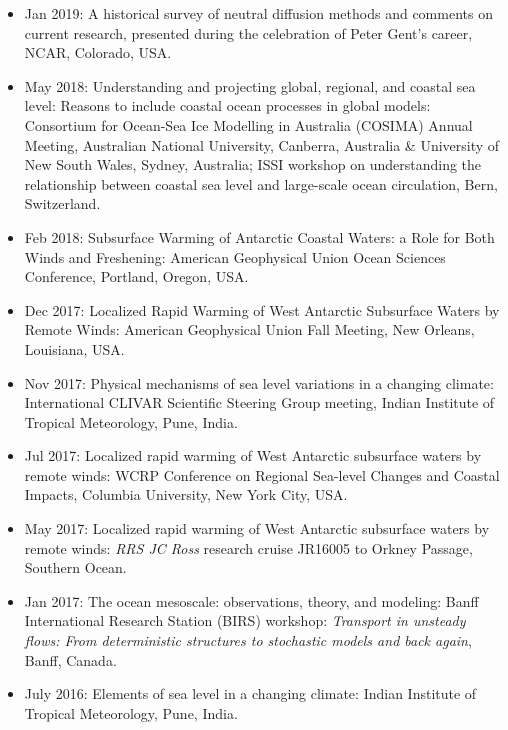 \begin{itemize}[leftmargin=*]
\item Jan 2019: {\sc A historical survey of neutral diffusion methods and comments on current research}, presented during the celebration of Peter Gent's career, NCAR, Colorado, USA.  

\item May 2018: {\sc Understanding and projecting global, regional, and coastal sea level: Reasons to include coastal ocean processes in global models}: Consortium for Ocean-Sea Ice Modelling in Australia (COSIMA) Annual Meeting, Australian National University, Canberra, Australia \& University of New South Wales, Sydney, Australia; ISSI workshop on understanding the relationship between coastal sea level and large-scale ocean circulation, Bern, Switzerland. 

\item Feb 2018: {\sc Subsurface Warming of Antarctic Coastal Waters: a Role for Both Winds and Freshening}: {\sc American Geophysical Union Ocean Sciences Conference}, Portland, Oregon, USA.

\item Dec 2017: {\sc Localized Rapid Warming of West Antarctic Subsurface Waters by Remote Winds}: American Geophysical Union Fall Meeting, New Orleans, Louisiana, USA. 

\item Nov 2017: {\sc Physical mechanisms of sea level variations in a changing climate}: International CLIVAR Scientific Steering Group meeting, Indian Institute of Tropical Meteorology, Pune, India.


\item Jul 2017: {\sc Localized rapid warming of West Antarctic
    subsurface waters by remote winds}: WCRP Conference on Regional
  Sea-level Changes and Coastal Impacts, Columbia University, New York City, USA. 

\item May 2017: {\sc Localized rapid warming of West Antarctic
    subsurface waters by remote winds}: {\it RRS JC Ross} research cruise
  JR16005 to Orkney Passage, Southern Ocean.

\item Jan 2017: {\sc The ocean mesoscale: observations, theory, and
    modeling}: Banff International Research Station (BIRS) workshop:
  {\it Transport in unsteady flows: From deterministic structures to
    stochastic models and back again}, Banff, Canada.

\item July 2016: {\sc Elements of sea level in a changing climate}:
  Indian Institute of Tropical Meteorology, Pune, India.


\end{itemize}
